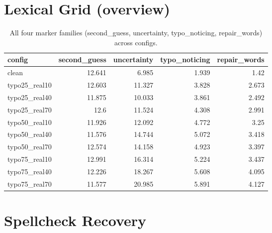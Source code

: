 \documentclass[11pt]{article}
\begin{document}
\section*{Lexical Grid (overview)}
\begin{table}[H]
\centering
\caption{All four marker families (second\_guess, uncertainty, typo\_noticing, repair\_words) across configs.}
\small
\begin{adjustbox}{max width=\textwidth}
\begin{tabular}{lrrrr}
\toprule
\textbf{config} & \textbf{second\_guess} & \textbf{uncertainty} & \textbf{typo\_noticing} & \textbf{repair\_words} \\
\midrule
clean & 12.641 & 6.985 & 1.939 & 1.42 \\
typo25\_real10 & 12.603 & 11.327 & 3.828 & 2.673 \\
typo25\_real40 & 11.875 & 10.033 & 3.861 & 2.492 \\
typo25\_real70 & 12.6 & 11.524 & 4.308 & 2.991 \\
typo50\_real10 & 11.926 & 12.092 & 4.772 & 3.25 \\
typo50\_real40 & 11.576 & 14.744 & 5.072 & 3.418 \\
typo50\_real70 & 12.574 & 14.158 & 4.923 & 3.397 \\
typo75\_real10 & 12.991 & 16.314 & 5.224 & 3.437 \\
typo75\_real40 & 12.226 & 18.267 & 5.608 & 4.095 \\
typo75\_real70 & 11.577 & 20.985 & 5.891 & 4.127 \\
\bottomrule
\end{tabular}
\end{adjustbox}
\end{table}

\section*{Spellcheck Recovery}

\end{document}
